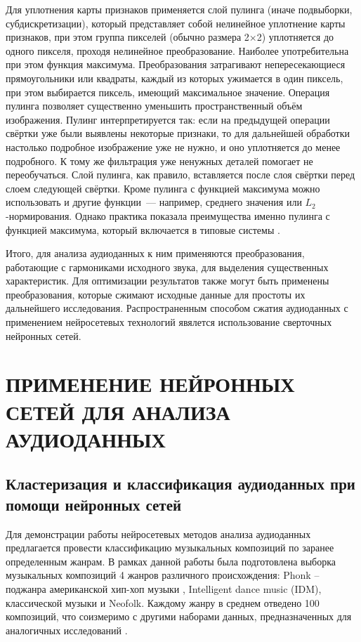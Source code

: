 Для уплотнения карты признаков применяется слой пулинга (иначе подвыборки, субдискретизации), который представляет собой нелинейное уплотнение карты признаков, при этом группа пикселей (обычно размера 2×2) уплотняется до одного пикселя, проходя нелинейное преобразование. Наиболее употребительна при этом функция максимума. Преобразования затрагивают непересекающиеся прямоугольники или квадраты, каждый из которых ужимается в один пиксель, при этом выбирается пиксель, имеющий максимальное значение. Операция пулинга позволяет существенно уменьшить пространственный объём изображения. Пулинг интерпретируется так: если на предыдущей операции свёртки уже были выявлены некоторые признаки, то для дальнейшей обработки настолько подробное изображение уже не нужно, и оно уплотняется до менее подробного. К тому же фильтрация уже ненужных деталей помогает не переобучаться. Слой пулинга, как правило, вставляется после слоя свёртки перед слоем следующей свёртки.
Кроме пулинга с функцией максимума можно использовать и другие функции — например, среднего значения или $L_2$-нормирования. Однако практика показала преимущества именно пулинга с функцией максимума, который включается в типовые системы \cite{wikiconv}. 

Итого, для анализа аудиоданных к ним применяются преобразования, работающие с гармониками исходного звука, для выделения
существенных характеристик. Для оптимизации результатов также могут быть применены преобразования, которые сжимают исходные данные для простоты их дальнейшего исследования.
Распространенным способом сжатия аудиоданных с применением нейросетевых технологий явялется использование сверточных нейронных сетей.

\chapter{ПРИМЕНЕНИЕ НЕЙРОННЫХ СЕТЕЙ ДЛЯ АНАЛИЗА АУДИОДАННЫХ} 
\section{Кластеризация и классификация аудиоданных при помощи нейронных сетей}
Для демонстрации работы нейросетевых методов анализа аудиоданных предлагается провести классификацию музыкальных композиций
по заранее определенным жанрам. В рамках данной работы была подготовлена выборка музыкальных композиций 4 жанров различного происхождения:
Phonk -- поджанра американской хип-хоп музыки \cite{phonk}, Intelligent dance music (IDM), классической музыки и Neofolk. Каждому жанру в среднем отведено 100 композиций, что соизмеримо с другими наборами данных, предназначенных для аналогичных исследований \cite{gtzan}.


